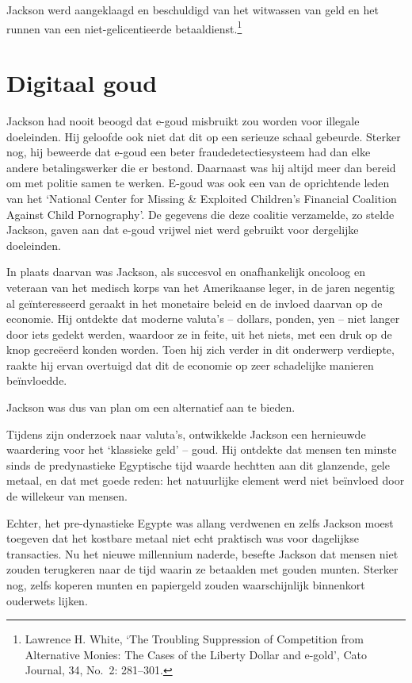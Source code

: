\documentclass[smalldemyvopaper,11pt,twoside,onecolumn,openright,extrafontsizes,hidelinks]{memoir}
\begin{document}
Jackson werd aangeklaagd en beschuldigd van het witwassen van geld en
het runnen van een niet-gelicentieerde betaaldienst.\footnote{\hspace{0pt}Lawrence
  H. White, `The Troubling Suppression of Competition from Alternative
  Monies: The Cases of the Liberty Dollar and e-gold', Cato Journal, 34,
  No.~2: 281--301.}

\section*{Digitaal goud}\label{digitaal-goud}


Jackson had nooit beoogd dat e-goud misbruikt zou worden voor illegale
doeleinden. Hij geloofde ook niet dat dit op een serieuze schaal
gebeurde. Sterker nog, hij beweerde dat e-goud een beter
fraudedetectiesysteem had dan elke andere betalingswerker die er
bestond. Daarnaast was hij altijd meer dan bereid om met politie samen
te werken. E-goud was ook een van de oprichtende leden van het `National
Center for Missing \& Exploited Children's Financial Coalition Against
Child Pornography'. De gegevens die deze coalitie verzamelde, zo stelde
Jackson, gaven aan dat e-goud vrijwel niet werd gebruikt voor dergelijke
doeleinden.

In plaats daarvan was Jackson, als succesvol en onafhankelijk oncoloog
en veteraan van het medisch korps van het Amerikaanse leger, in de jaren
negentig al geïnteresseerd geraakt in het monetaire beleid en de invloed
daarvan op de economie. Hij ontdekte dat moderne valuta's -- dollars,
ponden, yen -- niet langer door iets gedekt werden, waardoor ze in
feite, uit het niets, met een druk op de knop gecreëerd konden worden.
Toen hij zich verder in dit onderwerp verdiepte, raakte hij ervan
overtuigd dat dit de economie op zeer schadelijke manieren beïnvloedde.

Jackson was dus van plan om een alternatief aan te bieden.

Tijdens zijn onderzoek naar valuta's, ontwikkelde Jackson een hernieuwde
waardering voor het `klassieke geld' -- goud. Hij ontdekte dat mensen
ten minste sinds de predynastieke Egyptische tijd waarde hechtten aan
dit glanzende, gele metaal, en dat met goede reden: het natuurlijke
element werd niet beïnvloed door de willekeur van mensen.

Echter, het pre-dynastieke Egypte was allang verdwenen en zelfs Jackson
moest toegeven dat het kostbare metaal niet echt praktisch was voor
dagelijkse transacties. Nu het nieuwe millennium naderde, besefte
Jackson dat mensen niet zouden terugkeren naar de tijd waarin ze
betaalden met gouden munten. Sterker nog, zelfs koperen munten en
papiergeld zouden waarschijnlijk binnenkort ouderwets lijken.
\end{document}
